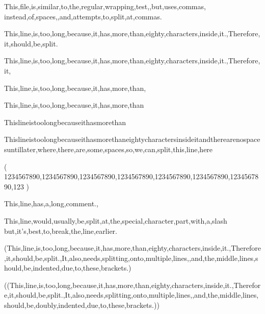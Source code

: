 \documentclass{article}
\begin{document}
This,file,is,similar,to,the,regular,wrapping,test,,but,uses,commas,
instead,of,spaces,,and,attempts,to,split,at,commas.

This,line,is,too,long,because,it,has,more,than,eighty,characters,inside,it.,Therefore,it,should,be,split.

This,line,is,too,long,because,it,has,more,than,eighty,characters,inside,it.,Therefore,it,%

This,line,is,too,long,because,it,has,more,than,%

This,line,is,too,long,because,it,has,more,than%

Thislineistoolongbecauseithasmorethan%

Thislineistoolongbecauseithasmorethaneightycharactersinsideitandtherearenospacesuntillater,where,there,are,some,spaces,so,we,can,split,this,line,here

(
1234567890,1234567890,1234567890,1234567890,1234567890,1234567890,1234567890,123
)

This,line,has,a,long,comment.,%


This,line,would,usually,be,split,at,the,special,character,part,with,a,slash\,but,it's,best,to,break,the,line,earlier.

(This,line,is,too,long,because,it,has,more,than,eighty,characters,inside,it.,Therefore,it,should,be,split.,It,also,needs,splitting,onto,multiple,lines,,and,the,middle,lines,should,be,indented,due,to,these,brackets.)

((This,line,is,too,long,because,it,has,more,than,eighty,characters,inside,it.,Therefore,it,should,be,split.,It,also,needs,splitting,onto,multiple,lines,,and,the,middle,lines,should,be,doubly,indented,due,to,these,brackets.))
\end{document}
